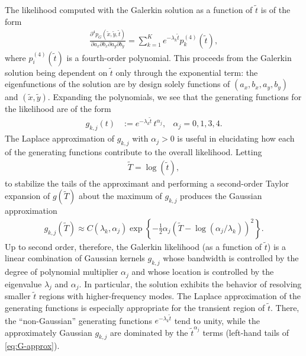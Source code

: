 The likelihood computed with the Galerkin solution as a
function of $\tilde{t}$ is of the form
\begin{align*}
  \frac{\partial^4 p_{G}(\tilde{x}, \tilde{y}, \tilde{t})}{\partial a_x
  \partial b_x \partial a_y \partial b_y} = \sum_{k=1}^{K} e^{-\lambda_k\tilde{t}} p_k^{(4)}(\tilde{t}),
\end{align*}
where $p_i^{(4)}(\tilde{t})$ is a fourth-order polynomial. This
proceeds from the Galerkin solution being dependent on $\tilde{t}$
only through the exponential term: the eigenfunctions of the solution
are by design solely functions of $(a_x, b_x, a_y, b_y)$ and
$(\tilde{x}, \tilde{y})$. Expanding the polynomials, we see that the
generating functions for the likelihood are of the form
\begin{align}
  g_{k,j}(t) &:= e^{-\lambda_k \tilde{t}}\, t^{\alpha_j}, & \alpha_j = 0, 1, 3, 4.
\end{align}
The Laplace approximation of $g_{k,j}$ with $\alpha_j > 0$ is useful
in elucidating how each of the generating functions contribute to the
overall likelihood. Letting
\begin{align}
  \tilde{T} = \log(\tilde{t}), 
\end{align}
to stabilize the tails of the approximant and performing a
second-order Taylor expansion of $g(\tilde{T})$ about the maximum
of $g_{k,j}$ produces the Gaussian approximation
\begin{align}
  g_{k,j}(\tilde{T}) \approx C(\lambda_k, \alpha_j) \exp\left\{ -\frac{1}{2}\alpha_j (\tilde{T} - \log(\alpha_j/\lambda_k))^2 \right\}. \label{eq:G-approx}
\end{align}
Up to second order, therefore, the Galerkin likelihood (as a function
of $\tilde{t}$) is a linear combination of Gaussian kernels $g_{k,j}$
whose bandwidth is controlled by the degree of polynomial multiplier
$\alpha_j$ and whose location is controlled by the eigenvalue
$\lambda_j$ and $\alpha_j$. In particular, the solution exhibits the
behavior of resolving smaller $\tilde{t}$ regions with
higher-frequency modes. The Laplace approximation of the generating
functions is especially appropriate for the transient region of
$\tilde{t}$. There, the ``non-Gaussian'' generating functions
$e^{-\lambda_k\tilde{t}}$ tend to unity, while the approximately
Gaussian $g_{k,j}$ are dominated by the $\tilde{t}^{\alpha_j}$ terms
(left-hand tails of \eqref{eq:G-approx}).

